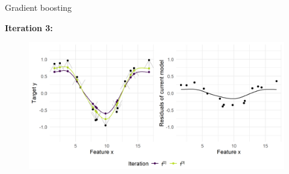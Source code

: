 \begin{vbframe}{Gradient boosting}
\begin{footnotesize}
\vspace*{0.1cm}
\textbf{Iteration 3:}
\begin{figure}
  \includegraphics[width=\textwidth]{figure/fig-gb-concept-idea-3.png}
\end{figure}

\end{footnotesize}
\end{vbframe}

